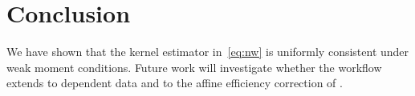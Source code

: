 \section{Conclusion}
\label{sec:conclusion}

We have shown that the kernel estimator in~\eqref{eq:nw} is uniformly
consistent under weak moment conditions. Future work will investigate
whether the workflow extends to dependent data and to the affine
efficiency correction of \cite{tsybakov2009introduction}.

